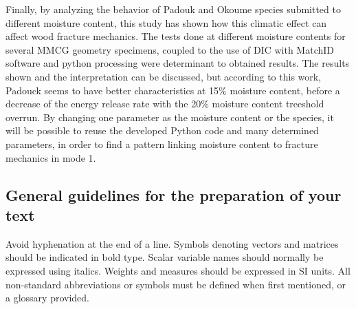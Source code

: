 \documentclass[3p,times,procedia]{elsarticle}
\begin{document}
Finally, by analyzing the behavior of Padouk and Okoume species submitted to different moisture content, this study has shown how this climatic effect can affect wood fracture mechanics.
\newline
The tests done at different moisture contents for several MMCG geometry specimens, coupled to the use of DIC with MatchID software and python processing were determinant to obtained results.
The results shown and the interpretation can be discussed, but according to this work, Padouck seems to have better characteristics at 15\% moisture content, before a decrease of the energy release rate with the 20\% moisture content treeshold overrun. 
\newline
By changing one parameter as the moisture content or the species, it will be possible to reuse the developed Python code and many determined parameters, in order to find a pattern linking moisture content to fracture mechanics in mode 1.



%
%


\subsection{General guidelines for the preparation of your text}
Avoid hyphenation at the end of a line. Symbols denoting vectors and matrices should be indicated in bold type. Scalar variable names should normally be expressed using italics. Weights and measures should be expressed in SI units. All non-standard abbreviations or symbols must be defined when first mentioned, or a glossary provided.
\end{document}
